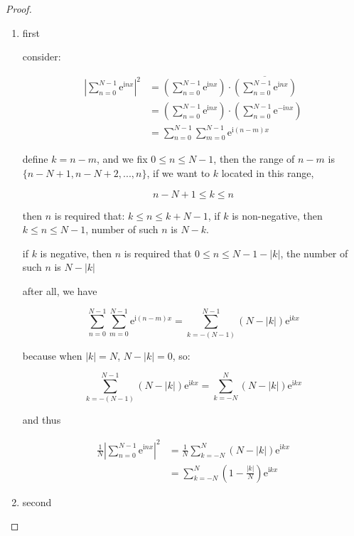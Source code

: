 \begin{proof}
    \begin{enumerate}
        \item first

    consider:

    \begin{align*}
        \left| \sum_{n=0}^{N-1} \mathrm{e}^{ \mathrm{i} nx } \right|^2 &= \left(\sum_{n=0}^{N-1} \mathrm{e}^{ \mathrm{i} nx } \right) \cdot \overline{\left(\sum_{n=0}^{N-1} \mathrm{e}^{ \mathrm{i} nx } \right)} \\
        &= \left(\sum_{n=0}^{N-1} \mathrm{e}^{ \mathrm{i} nx } \right) \cdot \left(\sum_{n=0}^{N-1} \mathrm{e}^{- \mathrm{i} nx } \right) \\
        &= \sum_{n=0}^{N-1} \sum_{m=0}^{N-1} \mathrm{e}^{\mathrm{i}(n-m)x}
    \end{align*}

    define $k = n -m $, and we fix $0 \le n \le N-1$, then the range of $n-m$ is $\{n-N+1, n-N+2,..., n \}$, 
    if we want to $k$ located in this range,

    \[
      n-N + 1 \le  k \le n
    \]

    then $n$ is required that: $k \le n \le k + N -1$, if $k$ is non-negative, then $k \le n \le N-1$, number of such $n$ is $N-k$.

    if $k$ is negative, then $n$ is required that $0 \le n \le N- 1- |k|$, the number of such $n$ is $N - |k|$

    after all, we have

    \[
\sum_{n=0}^{N-1} \sum_{m=0}^{N-1} \mathrm{e}^{ \mathrm{i}(n-m)x} = \sum_{k=-(N-1)}^{N-1}\left( N - |k| \right) \mathrm{e}^{\mathrm{i} k x}
    \]
    
    because when $|k| = N$, $N - |k| = 0$, so:

    \[
\sum_{k=-(N-1)}^{N-1}\left( N - |k| \right) \mathrm{e}^{ \mathrm{i} k x} = \sum_{k=-N}^{N}\left( N - |k| \right) \mathrm{e}^{ \mathrm{i} k x}
    \]

    and thus

    \begin{align*}
\frac{1}{N} \left| \sum_{n=0}^{N-1} \mathrm{e}^{ \mathrm{i} nx } \right|^2 &= \frac{1}{N}\sum_{k=-N}^{N}\left( N - |k| \right) \mathrm{e}^{\mathrm{i} k x}  \\
&= \sum_{k=-N}^{N}\left( 1 - \frac{|k|}{N} \right) \mathrm{e}^{ \mathrm{i} k x}
    \end{align*}


    \item second


\end{enumerate}
\end{proof}

